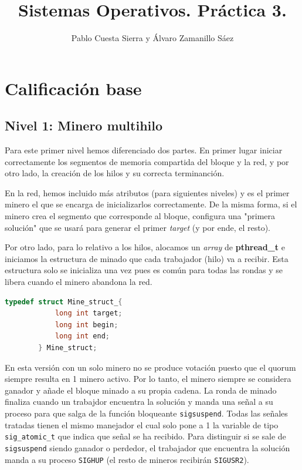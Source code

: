 \documentclass{article}
\begin{document}
\title{Sistemas Operativos. Práctica 3.}
\author{Pablo Cuesta Sierra y Álvaro Zamanillo Sáez}
\date{}
\maketitle

\begin{tcolorbox}
\tableofcontents
\end{tcolorbox}

\pagebreak

\section*{Calificación base}

\subsection*{Nivel 1: Minero multihilo}

    Para este primer nivel hemos diferenciado dos partes. En primer lugar iniciar correctamente los segmentos de memoria compartida del bloque y la red, y por otro lado, la creación de los hilos y su correcta terminanción. 

    En la red, hemos incluido más atributos (para siguientes niveles) y es el primer minero el que se encarga de inicializarlos correctamente.
    De la misma forma, si el minero crea el segmento que corresponde al bloque, configura una "primera solución" que se usará para generar el primer \textit{target} (y por ende, el resto).

    Por otro lado, para lo relativo a los hilos, alocamos un \textit{array} de \textbf{pthread\_t} e iniciamos la estructura de minado que cada trabajador (hilo) va a recibir. Esta estructura solo se inicializa una vez pues es común para todas las rondas y se libera cuando el minero abandona la red. 
    
    \begin{lstlisting}[language=C]
        typedef struct Mine_struct_{
            long int target;
            long int begin;
            long int end;
        } Mine_struct;  \end{lstlisting}


    En esta versión con un solo minero no se produce votación puesto que el quorum siempre resulta en 1 minero activo. Por lo tanto, el minero siempre se considera ganador y añade el bloque minado a su propia cadena. La ronda de minado finaliza cuando un trabajdor encuentra la solución y manda una señal a su proceso para que salga de la función bloqueante \texttt{sigsuspend}. Todas las señales tratadas tienen el mismo manejador el cual solo pone a 1 la variable de tipo \texttt{sig\_atomic\_t} que indica que señal se ha recibido. Para distinguir si se sale de \texttt{sigsuspend} siendo ganador o perdedor, el trabajador que encuentra la solución manda a su proceso \texttt{SIGHUP} (el resto de mineros recibirán \texttt{SIGUSR2}).
    
\end{document}
